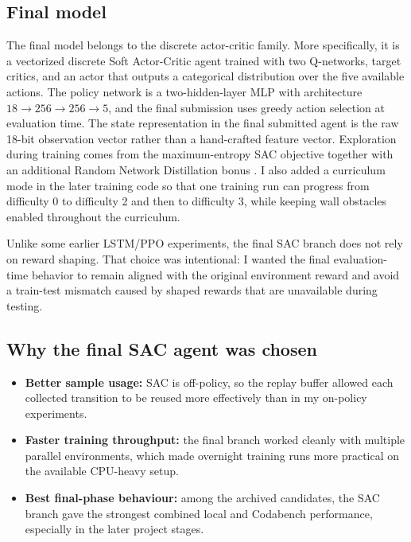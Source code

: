 \documentclass[11pt,oneside]{article}
\begin{document}
\subsection*{Final model}
The final model belongs to the discrete actor-critic family. More specifically, it is a vectorized discrete Soft Actor-Critic agent \cite{haarnoja2018soft} trained with two Q-networks, target critics, and an actor that outputs a categorical distribution over the five available actions. The policy network is a two-hidden-layer MLP with architecture $18 \rightarrow 256 \rightarrow 256 \rightarrow 5$, and the final submission uses greedy action selection at evaluation time. The state representation in the final submitted agent is the raw 18-bit observation vector rather than a hand-crafted feature vector. Exploration during training comes from the maximum-entropy SAC objective together with an additional Random Network Distillation bonus \cite{burda2019exploration}. I also added a curriculum mode in the later training code so that one training run can progress from difficulty 0 to difficulty 2 and then to difficulty 3, while keeping wall obstacles enabled throughout the curriculum.

Unlike some earlier LSTM/PPO experiments, the final SAC branch does not rely on reward shaping. That choice was intentional: I wanted the final evaluation-time behavior to remain aligned with the original environment reward and avoid a train-test mismatch caused by shaped rewards that are unavailable during testing.

\subsection*{Why the final SAC agent was chosen}
\begin{itemize}[leftmargin=*]
\item \textbf{Better sample usage:} SAC is off-policy, so the replay buffer allowed each collected transition to be reused more effectively than in my on-policy experiments.
\item \textbf{Faster training throughput:} the final branch worked cleanly with multiple parallel environments, which made overnight training runs more practical on the available CPU-heavy setup.
\item \textbf{Best final-phase behaviour:} among the archived candidates, the SAC branch gave the strongest combined local and Codabench performance, especially in the later project stages.
\end{itemize}
\end{document}
